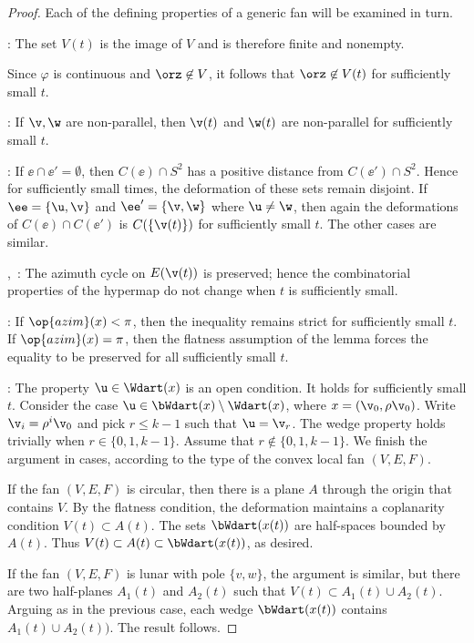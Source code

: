 \begin{proof} Each of the defining properties of a generic fan will be
examined in turn.

: The set $V(t)$ is the image of $V$ and is therefore finite
and nonempty.  

 Since $\varphi$ is continuous and
$\orz\not\in V$, it follows that $\orz\not\in V(t)$ for sufficiently
small $t$.

: If $\v,\w$ are non-parallel, then $\v(t)$ and
$\w(t)$ are non-parallel for sufficiently small $t$.

: If $\ee \cap \ee'=\emptyset$, then $C(\ee)\cap
S^2$ has a positive distance from $C(\ee')\cap S^2$.  Hence for
sufficiently small times, the deformation of these sets remain
disjoint.  If $\ee=\{\u,\v\}$ and $\ee'=\{\v,\w\}$ where $\u\ne\w$,
then again the deformations of $C(\ee)\cap C(\ee')$ is
$C(\{\v(t)\})$ for sufficiently small $t$.  The other cases are
similar.

,~: The azimuth cycle on $E(\v(t))$
is preserved; hence the combinatorial properties of the hypermap do
not change when $t$ is sufficiently small.

: If $\op{azim}(x)<\pi$, then the inequality remains
strict for sufficiently small $t$.  If $\op{azim}(x)=\pi$, then the
flatness assumption of the lemma forces the equality to be
preserved for all sufficiently small $t$.

: The property $\u\in \Wdart(x)$ is an open condition.
It holds for sufficiently small $t$. Consider the case $\u\in
\bWdart(x)\setminus \Wdart(x)$, where $x= (\v_0,\rho\v_0)$.  Write
$\v_i = \rho^i\v_0$ and pick $r\le k-1$ such that $\u = \v_r$.  The
wedge property holds trivially when $r\in\{0,1,k-1\}$. Assume that
$r\not\in\{0,1,k-1\}$.  We finish the argument in cases, according to 
the type of the convex local fan  $(V,E,F)$.

If the fan $(V,E,F)$ is circular, then there is a plane $A$ through the origin
that contains $V$.  By the flatness condition, the deformation maintains
a coplanarity condition $V(t)\subset A(t)$.  The sets $\bWdart(x(t))$ are half-spaces
bounded by $A(t)$.  Thus $V(t)\subset A(t)\subset \bWdart(x(t))$, as desired.

If the fan $(V,E,F)$ is lunar with pole $\{v,w\}$, 
the argument is similar, but there are two half-planes
$A_1(t)$ and $A_2(t)$  such that $V(t)\subset A_1(t)\cup A_2(t)$.  Arguing as
in the previous case, each wedge $\bWdart(x(t))$ 
contains $A_1(t)\cup A_2(t))$.  The result follows.


\end{proof}
